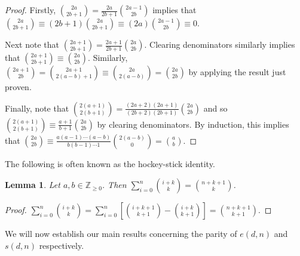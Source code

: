 \documentclass[11pt,a4paper,leqno]{amsart}
\newtheorem{lemma}[theorem]{Lemma}
\theoremstyle{definition}
\theoremstyle{remark}
\newcommand{\Z}{\mathbb{Z}}
\begin{document}
\begin{proof}
Firstly, $\binom{2a}{2b+1} = \frac{2a}{2b+1} \binom{2a-1}{2b}$ implies that $\binom{2a}{2b+1} \equiv (2b+1) \binom{2a}{2b+1} \equiv (2a) \binom{2a-1}{2b} \equiv 0$.

Next note that
$\binom{2a+1}{2b+1} = \frac{2a+1}{2b+1} \binom{2a}{2b}$. Clearing denominators similarly implies that $\binom{2a+1}{2b+1} \equiv \binom{2a}{2b}$. Similarly, $\binom{2a+1}{2b} = \binom{2a+1}{2(a-b)+1} \equiv \binom{2a}{2(a-b)} = \binom{2a}{2b}$ by applying the result just proven.

Finally, note that $\binom{2(a+1)}{2(b+1)} = \frac{(2a+2)(2a+1)}{(2b+2)(2b+1)} \binom{2a}{2b}$ and so $\binom{2(a+1)}{2(b+1)} \equiv \frac{a+1}{b+1} \binom{2a}{2b}$ by clearing denominators. By induction, this implies that $\binom{2a}{2b} \equiv \frac{a(a-1) \cdots (a-b)}{b(b-1) \cdots 1} \binom{2(a-b)}{0} = \binom{a}{b}$.
\end{proof}

The following is often known as the hockey-stick identity.

\begin{lemma} \label{lemma:hockey}
Let $a, b \in \Z_{\ge 0}$. Then $\sum_{i=0}^n \binom{i+k}{k} = \binom{n+k+1}{k}$.	
\end{lemma}

\begin{proof}
$\sum_{i=0}^n \binom{i+k}{k} = \sum_{i=0}^n \left[\binom{i+k+1}{k+1} - \binom{i+k}{k+1}\right] = \binom{n+k+1}{k+1}$.
\end{proof}

We will now establish our main results concerning the parity of $e(d,n)$ and $s(d,n)$ respectively.
\end{document}
